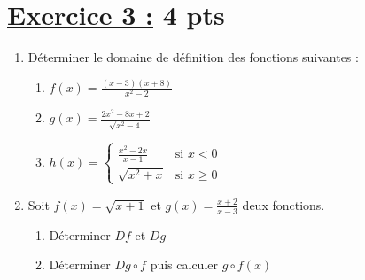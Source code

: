 \documentclass[12pt,a4paper]{article}
\begin{document}
\section*{\underline{Exercice 3 :} 4 pts }
\begin{enumerate}
    \item Déterminer le domaine de définition des fonctions suivantes :
    \begin{enumerate}
        \item  \( f(x) = \frac{(x - 3)(x + 8)}{x^2 - 2} \)
        \item \( g(x) = \frac{2x^2 - 8x + 2}{\sqrt{x^2 - 4}} \)
        \item \( h(x) = \left\{
        \begin{array}{ll}
            \frac{x^2 - 2x}{x - 1} & \text{si } x < 0 \\
            \sqrt{x^2 + x} & \text{si } x \geq 0
        \end{array}
    \right. \)
    \end{enumerate}
    \item Soit \( f(x) = \sqrt{x + 1} \) et \( g(x) = \frac{x + 2}{x - 3} \) deux fonctions.
\begin{enumerate}
    \item Déterminer \( Df \) et \( Dg \)
    \item Déterminer \( Dg \circ f \) puis calculer \( g \circ f(x) \)
\end{enumerate}
    
\end{enumerate}
\end{document}
